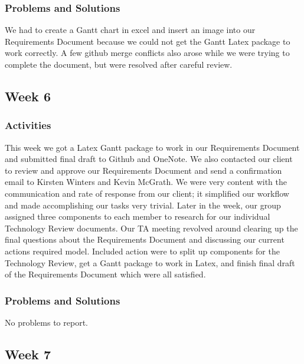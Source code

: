 \documentclass[journal,10pt,onecolumn,compsoc]{IEEEtran} \usepackage[margin=1.0in]{geometry} \usepackage{pdfpages}
\begin{document}
    \subsubsection{Problems and Solutions} 
    We had to create a Gantt chart in excel and insert an image into our Requirements Document because we could not get the Gantt Latex package to work correctly.
	A few github merge conflicts also arose while we were trying to complete the document, but were resolved after careful review.
    \subsection{Week 6}
    \subsubsection{Activities} 
    This week we got a Latex Gantt package to work in our Requirements Document and submitted final draft to Github and OneNote. We also contacted our client to review and approve our Requirements Document and send a confirmation email to Kirsten Winters and Kevin McGrath. We were very content with the communication and rate of response from our client; it simplified our workflow and made accomplishing our tasks very trivial. Later in the week, our group assigned three components to each member to research for our individual Technology Review documents.
    \noindent Our TA meeting revolved around clearing up the final questions about the Requirements Document and discussing our current actions required model. Included action were to split up components for the Technology Review, get a Gantt package to work in Latex, and finish final draft of the Requirements Document which were all satisfied.
    
    \subsubsection{Problems and Solutions} 
	No problems to report. %
    \subsection{Week 7}
\end{document}

